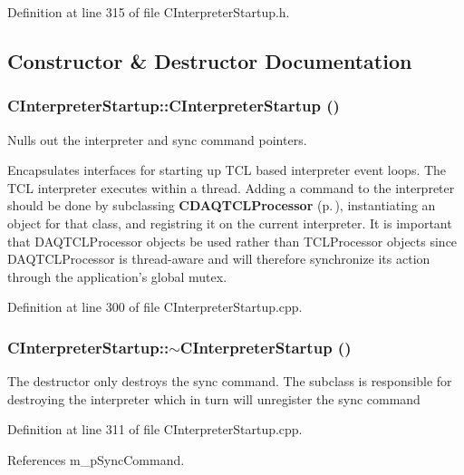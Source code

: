 Definition at line 315 of file CInterpreter\-Startup.h.

\subsection{Constructor \& Destructor Documentation}
\subsubsection{\setlength{\rightskip}{0pt plus 5cm}CInterpreter\-Startup::CInterpreter\-Startup ()}\label{classCInterpreterStartup_a0}


Nulls out the interpreter and sync command pointers.

Encapsulates interfaces for starting up  TCL based interpreter event loops. The TCL interpreter executes within a thread. Adding a command to the interpreter should be done by subclassing {\bf CDAQTCLProcessor} {\rm (p.\,\pageref{classCDAQTCLProcessor})}, instantiating an object for that class, and registring it on the current interpreter. It is important that DAQTCLProcessor objects be used rather than TCLProcessor objects since DAQTCLProcessor is thread-aware and will therefore synchronize its action  through the application's global mutex. 

Definition at line 300 of file CInterpreter\-Startup.cpp.
\subsubsection{\setlength{\rightskip}{0pt plus 5cm}CInterpreter\-Startup::$\sim$CInterpreter\-Startup ()\hspace{0.3cm}{\tt  [virtual]}}\label{classCInterpreterStartup_a1}


The destructor only destroys the sync command. The subclass is responsible for destroying the interpreter which in turn will unregister the sync command 

Definition at line 311 of file CInterpreter\-Startup.cpp.

References m\_\-p\-Sync\-Command.
